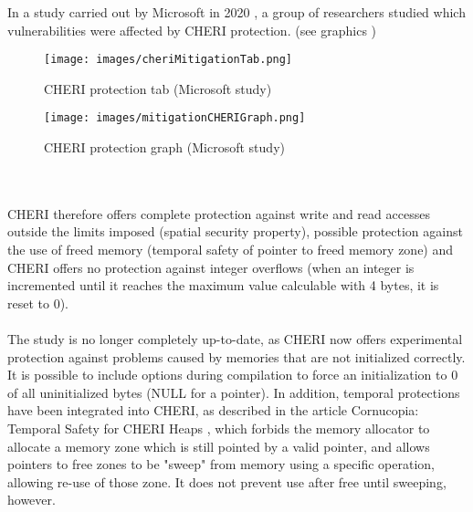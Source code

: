 \documentclass[a4paper, 11pt]{article}
\begin{document}
In a study carried out by Microsoft in 2020 \cite{joly2020security}, a group of researchers studied which vulnerabilities were affected by CHERI protection. (see graphics  )
\begin{figure}[h!]
	\centering
	\caption{CHERI protection tab (Microsoft study)\cite{joly2020security}}
	\label{sec:tab}
	\texttt{[image: images/cheriMitigationTab.png]}
\end{figure}
\begin{figure}[h!]
	\centering
	\caption{CHERI protection graph (Microsoft study)\cite{joly2020security}}
	\label{sec:graph}
	\texttt{[image: images/mitigationCHERIGraph.png]}
\end{figure}
\\ \\
CHERI therefore offers complete protection against write and read accesses outside the limits imposed (spatial security property), possible protection against the use of freed memory (temporal safety of pointer to freed memory zone) and CHERI offers no protection against integer overflows (when an integer is incremented until it reaches the maximum value calculable with 4 bytes, it is reset to 0). 
\\ \\
The study is no longer completely up-to-date, as CHERI now offers experimental protection against problems caused by memories that are not initialized correctly. It is possible to include options during compilation to force an initialization to 0 of all uninitialized bytes (NULL for a pointer).
In addition, temporal protections have been integrated into CHERI, as described in the article Cornucopia: Temporal Safety for CHERI Heaps \cite{filardo2020cornucopia}, which forbids the memory allocator to allocate a memory zone which is still pointed by a valid pointer, and allows pointers to free zones to be "sweep" from memory using a specific operation, allowing re-use of those zone. It does not prevent use after free until sweeping, however.
\\ \\
\end{document}
